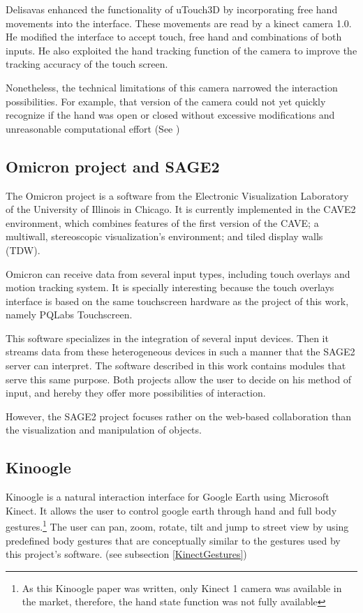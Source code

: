 \documentclass[12pt]{extarticle}
\begin{document}
Delisavas \cite{Deli13}enhanced the functionality of uTouch3D by incorporating free hand movements into the interface. These movements are read by a kinect camera 1.0. He modified the interface to accept touch, free hand and combinations of both inputs. He also exploited the hand tracking function of the camera to improve the tracking accuracy of the touch screen.

Nonetheless, the technical limitations of this camera narrowed the interaction possibilities. For example, that version of the camera could not yet quickly recognize if the hand was open or closed without excessive modifications and unreasonable computational effort (See \cite{HandRec})

\subsection {Omicron project and SAGE2}
The Omicron project is a software from the Electronic Visualization Laboratory of the University of Illinois in Chicago. It is currently implemented in the CAVE2 environment, which combines features of the first version of the CAVE; a multiwall, stereoscopic visualization\rq{}s environment; and tiled display walls (TDW).

Omicron can receive data from several input types, including touch overlays and motion tracking system. It is specially interesting because the touch overlays interface is based on the same touchscreen hardware as the project of this work, namely PQLabs Touchscreen.

This software specializes in the integration of several input devices. Then it streams data from these heterogeneous devices in such a manner that the SAGE2 server can interpret\cite{SAGE2}. The software described in this work contains modules that serve this same purpose. Both projects allow the user to decide on his method of input, and hereby they offer more possibilities of interaction.

However, the SAGE2 project focuses rather on the web-based collaboration than the visualization and manipulation of objects.

\subsection {Kinoogle}\label{subsec: kinoogle}
Kinoogle\cite{Kinoogle} is a natural interaction interface for Google Earth using Microsoft Kinect. It allows the user to control google earth through hand and full body gestures.\footnote{As this Kinoogle paper was written, only Kinect 1 camera was available in the market, therefore, the hand state function was not fully available} The user can pan, zoom, rotate, tilt and jump to street view by using predefined body gestures that are conceptually similar to the gestures used by this project\rq{}s software. (see subsection \ref{KinectGestures})
\end{document}
